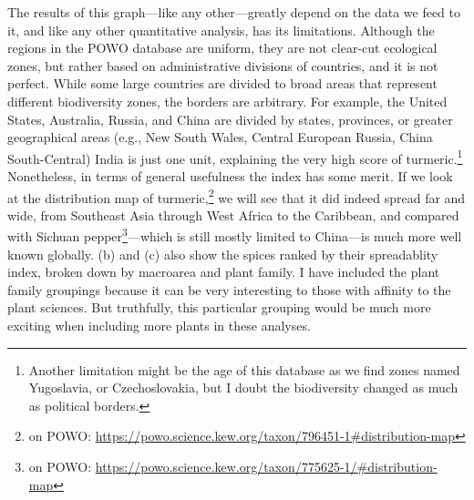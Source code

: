 The results of this graph---like any other---greatly depend on the data we feed to it, and like any other quantitative analysis, has its limitations. Although the regions in the \gls{POWO} database are uniform, they are not clear-cut ecological zones, but rather based on administrative divisions of countries, and it is not perfect. While some large countries are divided to broad areas that represent different biodiversity zones, the borders are arbitrary. For example, the United States, Australia, Russia, and China are divided by states, provinces, or greater geographical areas (e.g., New South Wales, Central European Russia, China South-Central) India is just one unit, explaining the very high score of turmeric.\footnote{Another limitation might be the age of this database as we find zones named Yugoslavia, or Czechoslovakia, but I doubt the biodiversity changed as much as political borders.} Nonetheless, in terms of general usefulness the index has some merit. If we look at the distribution map of turmeric,\footnote{ on \gls{POWO}: \url{https://powo.science.kew.org/taxon/796451-1\#distribution-map}} we will see that it did indeed spread far and wide, from Southeast Asia through West Africa to the Caribbean, and compared with Sichuan pepper\footnote{ on \gls{POWO}: \url{https://powo.science.kew.org/taxon/775625-1/\#distribution-map}}---which is still mostly limited to China---is much more well known globally.  (b) and (c) also show the spices ranked by their spreadablity index, broken down by macroarea and plant family. I have included the plant family groupings because it can be very interesting to those with affinity to the plant sciences. But truthfully, this particular grouping would be much more exciting when including more plants in these analyses. 



